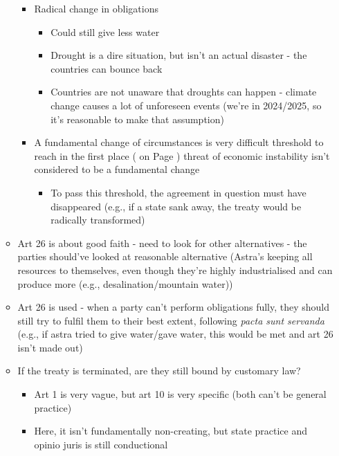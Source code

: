 \begin{itemize}
\begin{itemize}
\begin{itemize}
\begin{itemize}
            \end{itemize}
            \item Radical change in obligations
            \begin{itemize}
                \item Could still give less water
                \item Drought is a dire situation, but isn't an actual disaster - the countries can bounce back
                \item Countries are not unaware that droughts can happen - climate change causes a lot of unforeseen events (we're in 2024/2025, so it's reasonable to make that assumption)                
            \end{itemize}
            \item A fundamental change of circumstances is very difficult threshold to reach in the first place ( on Page \pageref{case:UK v Norway Fisheries}) threat of economic instability isn't considered to be a fundamental change
            \begin{itemize}
                \item To pass this threshold, the agreement in question must have disappeared (e.g., if a state sank away, the treaty would be radically transformed)
            \end{itemize}
        \end{itemize}
        \item Art 26 is about good faith - need to look for other alternatives - the parties should've looked at reasonable alternative (Astra's keeping all resources to themselves, even though they're highly industrialised and can produce more (e.g., desalination/mountain water))
        \item Art 26 is used - when a party can't perform obligations fully, they should still try to fulfil them to their best extent, following \textit{pacta sunt servanda} (e.g., if astra tried to give water/gave water, this would be met and art 26 isn't made out)
        \item If the treaty is terminated, are they still bound by customary law?
        \begin{itemize}
            \item Art 1 is very vague, but art 10 is very specific (both can't be general practice)
            \item Here, it isn't fundamentally non-creating, but state practice and opinio juris is still conductional

\end{itemize}
\end{itemize}
\end{itemize}

